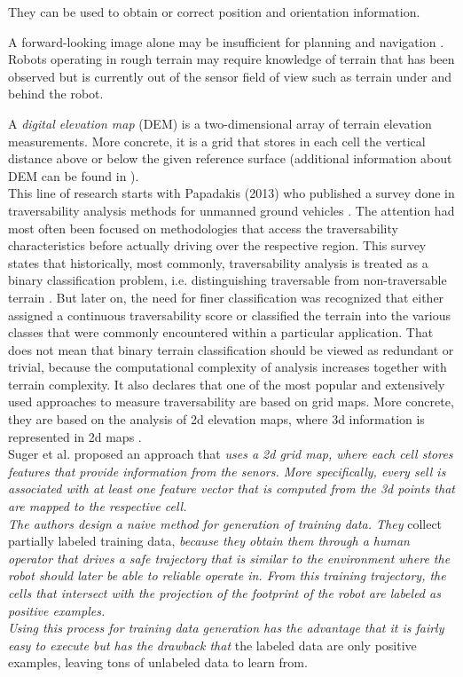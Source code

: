 \documentclass[12pt,a4paper]{report}
\newcommand{\term}{\textit}
\begin{document}
	
	They can be used to obtain or correct position and orientation information.
	
	
	A forward-looking image alone may be insufficient for planning and navigation
	\cite{Kweon}. Robots operating in rough terrain may require knowledge of 
	terrain that has been observed but is currently out of the sensor field of
	view such as terrain under and behind the robot.
	
	A \term{digital elevation map} (DEM) is a two-dimensional array of terrain 
	elevation measurements. More concrete, it is a grid that stores in each cell 
	the vertical distance above or below the given reference surface (additional
	information about DEM can be found in \cite{Kweon}).
	\\
	
	This line of research starts with Papadakis (2013) who published a 
	survey done in traversability analysis methods for unmanned ground vehicles 
	\cite{Papadakis}. 
	The attention had most often been focused on methodologies that access the 
	traversability characteristics before actually driving over the respective 
	region.
	This survey states that historically, most commonly, traversability analysis is treated 
	as a binary classification problem, i.e. distinguishing traversable from 
	non-traversable terrain \cite{Suger, Hirose, Wigness}. 
	But later on, the need for finer classification was recognized that either assigned 
	a continuous traversability score or classified the terrain into the various classes 
	that were commonly encountered within a particular application.
	That does not mean that binary terrain classification should be viewed as redundant
	or trivial, because the computational complexity of analysis increases together 
	with terrain complexity.
	It also declares that one of the most popular and extensively used approaches 
	to measure traversability are based on grid 
	maps. More concrete, they are based on the analysis of 2d elevation maps, 
	where 3d information is represented in 2d maps \cite{Suger}.
	\\
	
	Suger et al. \cite{Suger} proposed an approach that \textit{uses a 2d grid map, where 
	each cell stores features that provide information from the senors. More 
	specifically, every sell is associated with at least one feature vector that is 
	computed from the 3d points that are mapped to the respective cell.
	\\
	The authors design a naive method for generation of training data. They} 
	collect partially labeled training data, \textit{because they obtain them through a 
	human operator that drives a safe trajectory that is similar to the 
	environment where the robot should later be able to reliable operate	in. From this 
	training trajectory, the cells that intersect with the projection of the footprint 
	of the robot are labeled as positive examples. 
	\\
	Using this process for training data generation has the advantage that it 
	is fairly easy to execute but has the drawback that} the labeled data are only 
	positive examples, leaving tons of unlabeled data to learn from.
	
\end{document}

